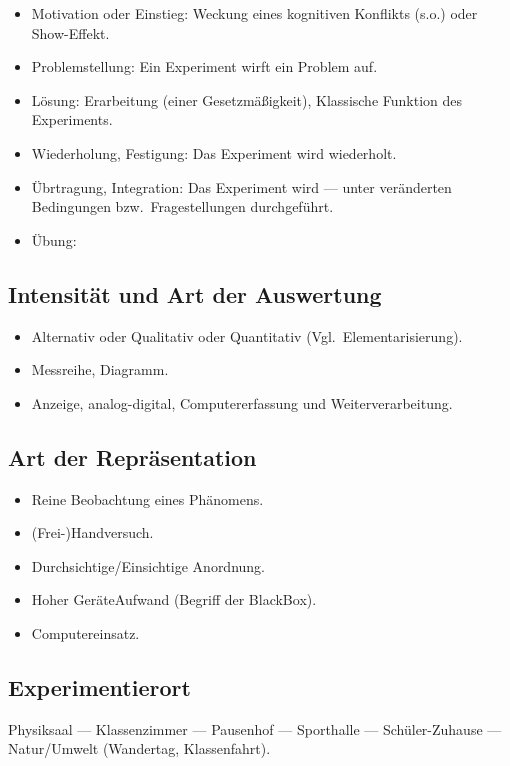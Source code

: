 \begin{itemize}
	\item
	Motivation oder Einstieg: Weckung eines kognitiven Konflikts (s.o.)
	oder Show-Effekt.
	\item
	Problemstellung: Ein Experiment wirft ein Problem auf.
	\item
	L\"{o}sung: Erarbeitung (einer Gesetzm\"{a}{\ss}igkeit),
	Klassische Funktion des Experiments.
	
	\item
	Wiederholung, Festigung: Das Experiment wird wiederholt.
	
	\item
	\"{U}brtragung, Integration: Das Experiment wird --- unter ver\"{a}nderten
	Bedingungen bzw.\ Fragestellungen durchgef\"{u}hrt.
	\item
	\"{U}bung: %
\end{itemize}

\subsection{Intensit\"{a}t und Art der Auswertung}
\begin{itemize}
	\item
	Alternativ oder
	Qualitativ oder Quantitativ (Vgl.\ Elementarisierung).
	\item
	Messreihe, Diagramm.
	\item
	Anzeige, analog-digital, Computererfassung und Weiterverarbeitung.
\end{itemize}

\subsection{Art der Repr\"{a}sentation}
\begin{itemize}
	\item
	Reine Beobachtung eines Ph\"{a}nomens.
	\item
	(Frei-)Handversuch.
	\item
	Durchsichtige/Einsichtige Anordnung.
	\item
	Hoher Ger\"{a}teAufwand (Begriff der BlackBox).
	\item
	Computereinsatz.
\end{itemize}

\subsection{Experimentierort}
Physiksaal --- Klassenzimmer --- Pausenhof --- Sporthalle
 --- Sch\"{u}ler-Zuhause --- Natur/Umwelt (Wandertag, Klassenfahrt).

